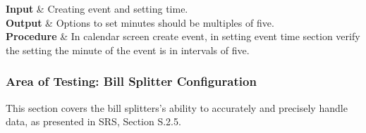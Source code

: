 \documentclass[12pt, titlepage]{article}
\begin{document}
\begin{center}
{	    \textbf{Input} & Creating event and setting time. \\ 
	
	    \textbf{Output} & Options to set minutes should be multiples of five. \\ 
	
	    \textbf{Procedure} & In calendar screen create event, in setting event time section verify the setting the minute of the event is in intervals of five.  \\ 
  }
 
\end{center}

\subsubsection{Area of Testing: Bill Splitter Configuration}
This section covers the bill splitters's ability to accurately and precisely handle data, as presented in SRS, Section S.2.5.
\end{document}
